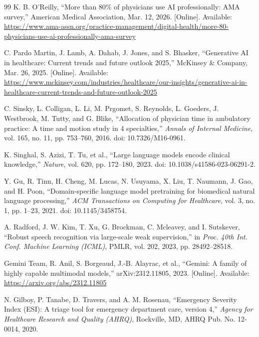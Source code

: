 \documentclass[conference]{IEEEtran}
\begin{document}
\begin{thebibliography}{99}
K. B. O'Reilly,
``More than 80\% of physicians use AI professionally: AMA survey,''
American Medical Association, Mar. 12, 2026. [Online].
Available: \url{https://www.ama-assn.org/practice-management/digital-health/more-80-physicians-use-ai-professionally-ama-survey}

C. Pardo Martin, J. Lamb, A. Dahab, J. Jones, and S. Bhasker,
``Generative AI in healthcare: Current trends and future outlook 2025,''
McKinsey \& Company, Mar. 26, 2025. [Online].
Available: \url{https://www.mckinsey.com/industries/healthcare/our-insights/generative-ai-in-healthcare-current-trends-and-future-outlook-2025}

C. Sinsky, L. Colligan, L. Li, M. Prgomet, S. Reynolds,
L. Goeders, J. Westbrook, M. Tutty, and G. Blike,
``Allocation of physician time in ambulatory practice:
A time and motion study in 4 specialties,''
\textit{Annals of Internal Medicine}, vol. 165, no. 11,
pp. 753--760, 2016.
doi: 10.7326/M16-0961.


K. Singhal, S. Azizi, T. Tu, et al.,
``Large language models encode clinical knowledge,''
\textit{Nature}, vol. 620, pp. 172--180, 2023.
doi: 10.1038/s41586-023-06291-2.

Y. Gu, R. Tinn, H. Cheng, M. Lucas, N. Usuyama,
X. Liu, T. Naumann, J. Gao, and H. Poon,
``Domain-specific language model pretraining for biomedical natural language processing,''
\textit{ACM Transactions on Computing for Healthcare},
vol. 3, no. 1, pp. 1--23, 2021.
doi: 10.1145/3458754.

A. Radford, J. W. Kim, T. Xu, G. Brockman,
C. Mcleavey, and I. Sutskever,
``Robust speech recognition via large-scale weak supervision,''
in \textit{Proc. 40th Int. Conf. Machine Learning (ICML)},
PMLR, vol. 202, 2023, pp. 28492--28518.

Gemini Team, R. Anil, S. Borgeaud, J.-B. Alayrac, et al.,
``Gemini: A family of highly capable multimodal models,''
arXiv:2312.11805, 2023.
[Online]. Available:
\url{https://arxiv.org/abs/2312.11805}


N. Gilboy, P. Tanabe, D. Travers, and A. M. Rosenau,
``Emergency Severity Index (ESI): A triage tool for emergency department care, version 4,''
\textit{Agency for Healthcare Research and Quality (AHRQ)},
Rockville, MD, AHRQ Pub. No. 12-0014, 2020.


\end{thebibliography}
\end{document}
